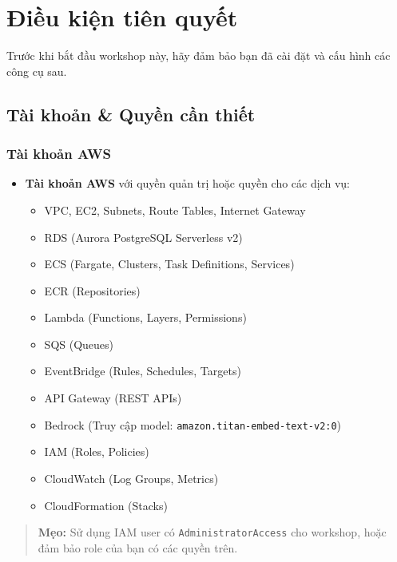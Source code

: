 \hypertarget{ux111iux1ec1u-kiux1ec7n-tiuxean-quyux1ebft}{%
\section{Điều kiện tiên
quyết}}

Trước khi bắt đầu workshop này, hãy đảm bảo bạn đã cài đặt và cấu hình
các công cụ sau.

\hypertarget{tuxe0i-khoux1ea3n-quyux1ec1n-cux1ea7n-thiux1ebft}{%
\subsection{Tài khoản \& Quyền cần
thiết}}

\hypertarget{tuxe0i-khoux1ea3n-aws}{%
\subsubsection{Tài khoản AWS}}

\begin{itemize}
\tightlist
\item
  \textbf{Tài khoản AWS} với quyền quản trị hoặc quyền cho các dịch vụ:

  \begin{itemize}
  \tightlist
  \item
    VPC, EC2, Subnets, Route Tables, Internet Gateway
  \item
    RDS (Aurora PostgreSQL Serverless v2)
  \item
    ECS (Fargate, Clusters, Task Definitions, Services)
  \item
    ECR (Repositories)
  \item
    Lambda (Functions, Layers, Permissions)
  \item
    SQS (Queues)
  \item
    EventBridge (Rules, Schedules, Targets)
  \item
    API Gateway (REST APIs)
  \item
    Bedrock (Truy cập model: \texttt{amazon.titan-embed-text-v2:0})
  \item
    IAM (Roles, Policies)
  \item
    CloudWatch (Log Groups, Metrics)
  \item
    CloudFormation (Stacks)
  \end{itemize}
\end{itemize}

\begin{quote}
\textbf{Mẹo:} Sử dụng IAM user có \texttt{AdministratorAccess} cho
workshop, hoặc đảm bảo role của bạn có các quyền trên.
\end{quote}

